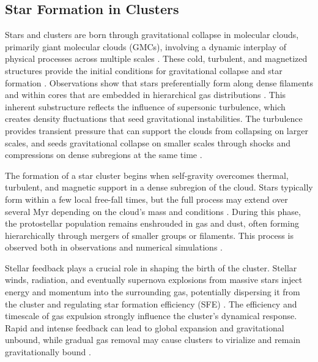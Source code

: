 \documentclass[12pt]{ucsddissertation}
\begin{document}
\begin{CJK*}{UTF8}{gbsn}
%
%
\section*{Star Formation in Clusters}%

Stars and clusters are born through gravitational collapse in molecular clouds, primarily giant molecular clouds (GMCs), involving a dynamic interplay of physical processes across multiple scales \citep[e.g.,][]{Krumholz-2019, Beuther-2025}. These cold, turbulent, and magnetized structures provide the initial conditions for gravitational collapse and star formation \citep[e.g.,][]{McKee-2007}. Observations show that stars preferentially form along dense filaments and within cores that are embedded in hierarchical gas distributions \citep[e.g.,][]{Molinari-2010, Andre-2014}. This inherent substructure reflects the influence of supersonic turbulence, which creates density fluctuations that seed gravitational instabilities. The turbulence provides transient pressure that can support the clouds from collapsing on larger scales, and seeds gravitational collapse on smaller scales through shocks and compressions on dense subregions at the same time \citep[e.g.,][]{MacLow-2004, Padoan-2014}.

The formation of a star cluster begins when self-gravity overcomes thermal, turbulent, and magnetic support in a dense subregion of the cloud. Stars typically form within a few local free-fall times, but the full process may extend over several Myr depending on the cloud's mass and conditions \citep[e.g.,][]{Kruijssen-2012}. During this phase, the protostellar population remains enshrouded in gas and dust, often forming hierarchically through mergers of smaller groups or filaments. This process is observed both in observations and numerical simulations \citep[e.g.,][]{Bonnell-2003, Walker-2015, Grudic-2018}.

Stellar feedback plays a crucial role in shaping the birth of the cluster. Stellar winds, radiation, and eventually supernova explosions from massive stars inject energy and momentum into the surrounding gas, potentially dispersing it from the cluster and regulating star formation efficiency (SFE) \citep[e.g.,][]{Baumgardt-2007, Krause-2016, Dinnbier-2020}. The efficiency and timescale of gas expulsion strongly influence the cluster's dynamical response. Rapid and intense feedback can lead to global expansion and gravitational unbound, while gradual gas removal may cause clusters to virialize and remain gravitationally bound \citep[e.g.,][]{Goodwin-2006, Dinnbier-2020}.


\end{CJK*}
\end{document}
